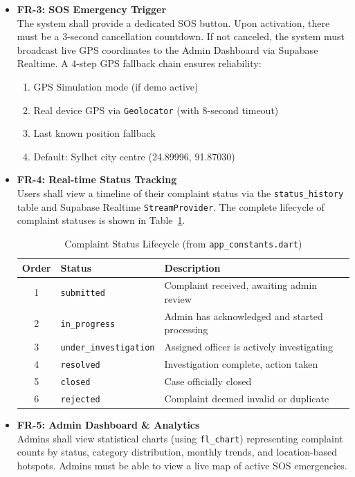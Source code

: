 \documentclass[11pt, a4paper]{report}
\begin{document}
\begin{itemize}
    \item \textbf{FR-3: SOS Emergency Trigger}\\
    The system shall provide a dedicated SOS button. Upon activation, there must be a 3-second cancellation countdown. If not canceled, the system must broadcast live GPS coordinates to the Admin Dashboard via Supabase Realtime. A 4-step GPS fallback chain ensures reliability:
    \begin{enumerate}
        \item GPS Simulation mode (if demo active)
        \item Real device GPS via \texttt{Geolocator} (with 8-second timeout)
        \item Last known position fallback
        \item Default: Sylhet city centre (24.89996, 91.87030)
    \end{enumerate}

    \item \textbf{FR-4: Real-time Status Tracking}\\
    Users shall view a timeline of their complaint status via the \texttt{status\_history} table and Supabase Realtime \texttt{StreamProvider}. The complete lifecycle of complaint statuses is shown in Table~\ref{tab:statusflow}.

    \begin{table}[ht]
    \centering
    \caption{Complaint Status Lifecycle (from \texttt{app\_constants.dart})}
    \label{tab:statusflow}
    \begin{tabularx}{\textwidth}{clX}
    \toprule
    \textbf{Order} & \textbf{Status} & \textbf{Description} \\
    \midrule
    1 & \texttt{submitted} & Complaint received, awaiting admin review \\
    2 & \texttt{in\_progress} & Admin has acknowledged and started processing \\
    3 & \texttt{under\_investigation} & Assigned officer is actively investigating \\
    4 & \texttt{resolved} & Investigation complete, action taken \\
    5 & \texttt{closed} & Case officially closed \\
    6 & \texttt{rejected} & Complaint deemed invalid or duplicate \\
    \bottomrule
    \end{tabularx}
    \end{table}

    \item \textbf{FR-5: Admin Dashboard \& Analytics}\\
    Admins shall view statistical charts (using \texttt{fl\_chart}) representing complaint counts by status, category distribution, monthly trends, and location-based hotspots. Admins must be able to view a live map of active SOS emergencies.


\end{itemize}
\end{document}
